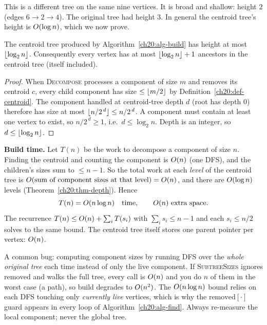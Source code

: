 This is a different tree on the same nine vertices. It is broad and shallow:
height $2$ (edges $6\to2\to4$). The original tree had height $3$. In general the
centroid tree's height is $O(\log n)$, which we now prove.

\begin{theorem}
\label{ch20:thm-depth}
The centroid tree produced by Algorithm~\ref{ch20:alg-build} has height at most
$\lfloor\log_2 n\rfloor$. Consequently every vertex has at most $\lfloor\log_2 n\rfloor+1$
ancestors in the centroid tree (itself included).
\end{theorem}

\begin{proof}
When \textsc{Decompose} processes a component of size $m$ and removes its centroid
$c$, every child component has size $\le\lfloor m/2\rfloor$ by
Definition~\ref{ch20:def-centroid}. The component handled at centroid-tree depth
$d$ (root has depth $0$) therefore has size at most $\lfloor n/2^{\,d}\rfloor\le n/2^{\,d}$.
A component must contain at least one vertex to exist, so $n/2^{\,d}\ge 1$, i.e.\
$d\le\log_2 n$. Depth is an integer, so $d\le\lfloor\log_2 n\rfloor$.
\end{proof}

\begin{complexitybox}
\textbf{Build time.} Let $T(n)$ be the work to decompose a component of size $n$.
Finding the centroid and counting the component is $O(n)$ (one DFS), and the
children's sizes sum to $\le n-1$. So the total work at each \emph{level} of the
centroid tree is $O(\text{sum of component sizes at that level})=O(n)$, and
there are $O(\log n)$ levels (Theorem~\ref{ch20:thm-depth}). Hence
\[
  T(n)=\Oh(n\log n)\quad\text{time},\qquad \Oh(n)\ \text{extra space}.
\]
The recurrence $T(n)\le O(n) + \sum_i T(s_i)$ with $\sum_i s_i\le n-1$ and each
$s_i\le n/2$ solves to the same bound. The centroid tree itself stores one parent
pointer per vertex: $O(n)$.
\end{complexitybox}

\begin{trapbox}
A common bug: computing component sizes by running DFS over the \emph{whole original
tree} each time instead of only the live component. If \textsc{SubtreeSizes}
ignores $\mathrm{removed}$ and walks the full tree, every call is $O(n)$ and you
do $n$ of them in the worst case (a path), so build degrades to $O(n^2)$. The
$O(n\log n)$ bound relies on each DFS touching only \emph{currently live}
vertices, which is why the $\mathrm{removed}[\cdot]$ guard appears in every loop of
Algorithm~\ref{ch20:alg-find}. Always re-measure the local component; never the
global tree.
\end{trapbox}

